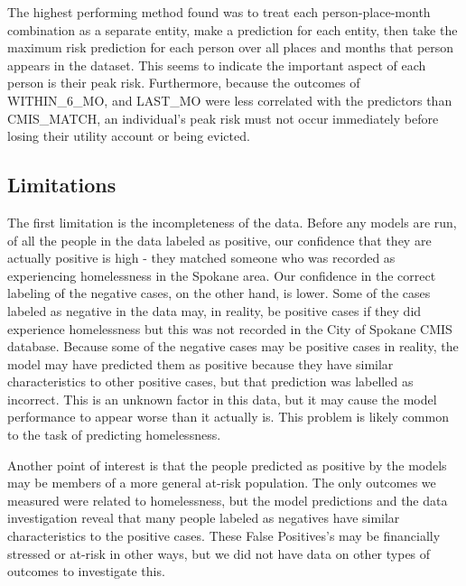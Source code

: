 \documentclass[10pt,letterpaper]{article}
\newcommand{\red}[1]{{\color{red}{#1}}}
\begin{document}
The highest performing method found was to treat each person-place-month combination as a separate entity, make a prediction for each entity, then take the maximum risk prediction for each person over all places and months that person appears in the dataset. This seems to indicate the important aspect of each person is their peak risk. Furthermore, because the outcomes of WITHIN\_6\_MO, and LAST\_MO were less correlated with the predictors than CMIS\_MATCH, an individual's peak risk must not occur immediately before losing their utility account or being evicted. 

\red{add that more appropriate methods could be used to deal with time series - LSTM}

\subsection*{Limitations}
The first limitation is the incompleteness of the data. Before any models are run, of all the people in the data labeled as positive, our confidence that they are actually positive is high - they matched someone who was recorded as experiencing homelessness in the Spokane area. Our confidence in the correct labeling of the negative cases, on the other hand, is lower. Some of the cases labeled as negative in the data may, in reality, be positive cases if they did experience homelessness but this was not recorded in the City of Spokane CMIS database. Because some of the negative cases may be positive cases in reality, the model may have predicted them as positive because they have similar characteristics to other positive cases, but that prediction was labelled as incorrect. This is an unknown factor in this data, but it may cause the model performance to appear worse than it actually is. This problem is likely common to the task of predicting homelessness. \red{add citation}

Another point of interest is that the people predicted as positive by the models may be members of a more general at-risk population. The only outcomes we measured were related to homelessness, but the model predictions and the data investigation reveal that many people labeled as negatives have similar characteristics to the positive cases. These False Positives's may be financially stressed or at-risk in other ways, but we did not have data on other types of outcomes to investigate this. \red{add info about Bryne's study - high prediction associated with drug addiction}
\end{document}

